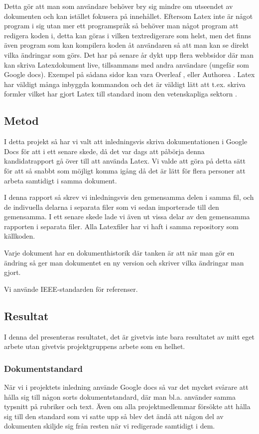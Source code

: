 	
Detta gör att man som användare behöver bry sig mindre om utseendet av dokumenten och kan istället fokusera på innehållet. Eftersom Latex inte är något program i sig utan mer ett programspråk så behöver man något program att redigera koden i, detta kan göras i vilken textredigerare som helst, men det finns även program som kan kompilera koden åt användaren så att man kan se direkt vilka ändringar som görs. Det har på senare år dykt upp flera webbsidor där man kan skriva Latexdokument live, tillsammans med andra användare (ungefär som Google docs). Exempel på sådana sidor kan vara Overleaf \cite{overleaf}, eller Authorea \cite{authorea}. Latex har väldigt många inbyggda kommandon och det är väldigt lätt att t.ex. skriva formler vilket har gjort Latex till standard inom den vetenskapliga sektorn \cite{latex_standard}.


\subsection{Metod}
I detta projekt så har vi valt att inledningsvis skriva dokumentationen i Google Docs för att i ett senare skede, då det var dags att påbörja denna kandidatrapport gå över till att använda Latex. Vi valde att göra på detta sätt för att så snabbt som möjligt komma igång då det är lätt  för flera personer att arbeta samtidigt i samma dokument.

I denna rapport så skrev vi inledningsvis den gemensamma delen i samma fil, och de indivuella delarna i separata filer som vi sedan importerade till den gemensamma. I ett senare skede lade vi även ut vissa delar av den gemensamma rapporten i separata filer. Alla Latexfiler har vi haft i samma repository som källkoden.

Varje dokument har en dokumenthistorik där tanken är att när man gör en ändring så ger man dokumentet en ny version och skriver vilka ändringar man gjort.

Vi använde IEEE-standarden för referenser.

\subsection{Resultat}
I denna del presenteras resultatet, det är givetvis inte bara resultatet av mitt eget arbete utan givetvis projektgruppens arbete som en helhet.

\subsubsection{Dokumentstandard}
När vi i projektets inledning använde Google docs så var det mycket svårare att hålla sig till någon sorts dokumentstandard, där man bl.a. använder samma typsnitt på rubriker och text. Även om alla projektmedlemmar försökte att hålla sig till den standard som vi satte upp så blev det ändå att någon del av dokumenten skiljde sig från resten när vi redigerade samtidigt i dem.

